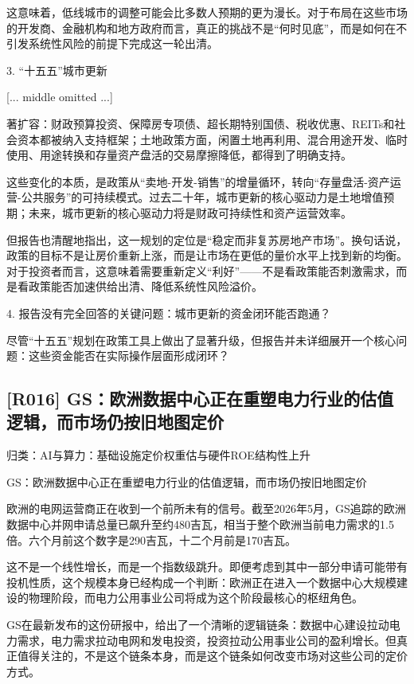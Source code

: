 \documentclass[11pt]{ctexart}
\begin{document}
这意味着，低线城市的调整可能会比多数人预期的更为漫长。对于布局在这些市场的开发商、金融机构和地方政府而言，真正的挑战不是“何时见底”，而是如何在不引发系统性风险的前提下完成这一轮出清。

3. “十五五”城市更新

[... middle omitted ...]

著扩容：财政预算投资、保障房专项债、超长期特别国债、税收优惠、REITs和社会资本都被纳入支持框架；土地政策方面，闲置土地再利用、混合用途开发、临时使用、用途转换和存量资产盘活的交易摩擦降低，都得到了明确支持。

这些变化的本质，是政策从“卖地-开发-销售”的增量循环，转向“存量盘活-资产运营-公共服务”的可持续模式。过去二十年，城市更新的核心驱动力是土地增值预期；未来，城市更新的核心驱动力将是财政可持续性和资产运营效率。

但报告也清醒地指出，这一规划的定位是“稳定而非复苏房地产市场”。换句话说，政策的目标不是让房价重新上涨，而是让市场在更低的量价水平上找到新的均衡。对于投资者而言，这意味着需要重新定义“利好”——不是看政策能否刺激需求，而是看政策能否加速供给出清、降低系统性风险溢价。

4. 报告没有完全回答的关键问题：城市更新的资金闭环能否跑通？

尽管“十五五”规划在政策工具上做出了显著升级，但报告并未详细展开一个核心问题：这些资金能否在实际操作层面形成闭环？

\subsection{[R016] GS：欧洲数据中心正在重塑电力行业的估值逻辑，而市场仍按旧地图定价}
{\small\color{refgray}归类：AI与算力：基础设施定价权重估与硬件ROE结构性上升}

GS：欧洲数据中心正在重塑电力行业的估值逻辑，而市场仍按旧地图定价

欧洲的电网运营商正在收到一个前所未有的信号。截至2026年5月，GS追踪的欧洲数据中心并网申请总量已飙升至约480吉瓦，相当于整个欧洲当前电力需求的1.5倍。六个月前这个数字是290吉瓦，十二个月前是170吉瓦。

这不是一个线性增长，而是一个指数级跳升。即便考虑到其中一部分申请可能带有投机性质，这个规模本身已经构成一个判断：欧洲正在进入一个数据中心大规模建设的物理阶段，而电力公用事业公司将成为这个阶段最核心的枢纽角色。

GS在最新发布的这份研报中，给出了一个清晰的逻辑链条：数据中心建设拉动电力需求，电力需求拉动电网和发电投资，投资拉动公用事业公司的盈利增长。但真正值得关注的，不是这个链条本身，而是这个链条如何改变市场对这些公司的定价方式。
\end{document}
